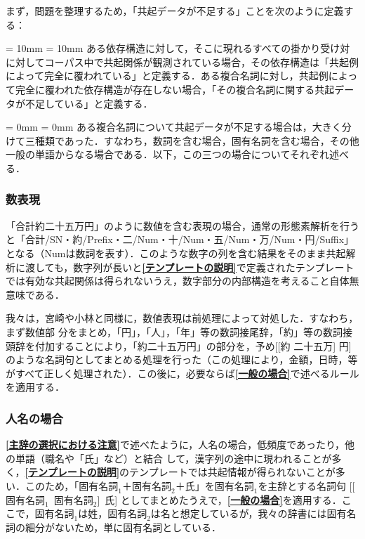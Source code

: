 まず，問題を整理するため，「共起データが不足する」ことを次のように定義する：

\leftskip = 10mm
\rightskip = 10mm
\noindent
ある依存構造に対して，そこに現れるすべての掛かり受け対に対してコーパス中で共起関係が観測されている場合，その依存構造は「共起例によって完全に覆われている」と定義する．ある複合名詞に対し，共起例によって完全に覆われた依存構造が存在しない場合，「その複合名詞に関する共起データが不足している」と定義する．

\leftskip = 0mm
\rightskip = 0mm
ある複合名詞について共起データが不足する場合は，大きく分けて三種類であった．すなわち，数詞を含む場合，固有名詞を含む場合，その他一般の単語からなる場合である．以下，この三つの場合についてそれぞれ述べる．

\vspace*{-2mm}

\subsubsection{数表現}\label{数表現}
「合計約二十五万円」のように数値を含む表現の場合，通常の形態素解析を行うと「合計/SN・約/Prefix・二/Num・十/Num・五/Num・万/Num・円/Suffix」となる（Numは数詞を表す）．このような数字の列を含む結果をそのまま共起解析に渡しても，数字列が長いと{\bf \ref{テンプレートの説明}}で定義されたテンプレートでは有効な共起関係は得られないうえ，数字部分の内部構造を考えること自体無意味である．

我々は，宮崎や小林と同様に，数値表現は前処理によって対処した．すなわち，まず数値部\break
分をまとめ，「円」，「人」，「年」等の数詞接尾辞，「約」等の数詞接頭辞を付加することにより，「約二十五万円」の部分を，予め[[約 二十五万] 円]のような名詞句としてまとめる処理を行った（この処理により，金額，日時，等がすべて正しく処理された）．この後に，必要ならば{\bf \ref{一般の場合}}で述べるルールを適用する．

\vspace*{-3mm}
\subsubsection{人名の場合}\label{人名の場合}
{\bf \ref{主辞の選択における注意}}で述べたように，人名の場合，低頻度であったり，他の単語（職名や「氏」など）と結合\break
して，漢字列の途中に現われることが多く，{\bf \ref{テンプレートの説明}}のテンプレートでは共起情報が得られないことが多い．このため，「$固有名詞_1$＋$固有名詞_2$＋氏」を$固有名詞_1$を主辞とする名詞句 [[$固有名詞_1$\ $固有名詞_2$]\ 氏] としてまとめたうえで，{\bf \ref{一般の場合}}を適用する．ここで，$固有名詞_1$は姓，$固有名詞_2$は名と想定しているが，我々の辞書には固有名詞の細分がないため，単に固有名詞としている．

